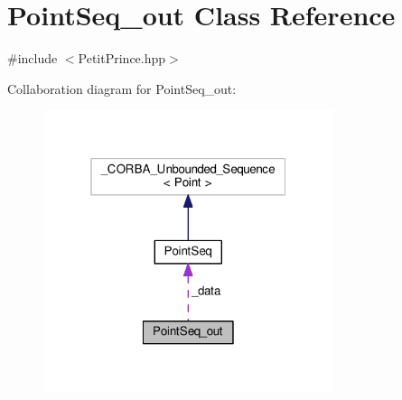 \hypertarget{class_point_seq__out}{}\section{Point\+Seq\+\_\+out Class Reference}
\label{class_point_seq__out}


{\ttfamily \#include $<$Petit\+Prince.\+hpp$>$}



Collaboration diagram for Point\+Seq\+\_\+out\+:
\nopagebreak
\begin{figure}[H]
\begin{center}
\leavevmode
\includegraphics[width=241pt]{class_point_seq__out__coll__graph}
\end{center}
\end{figure}
